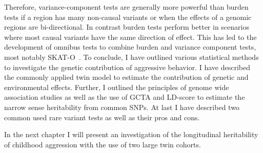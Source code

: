 Therefore, variance-component tests are generally more powerful than burden tests if a region has many non-causal variants or when the effects of a genomic regions are bi-directional.
In contrast burden tests perform better in scenarios where most causal variants have the same direction of effect.
This has led to the development of omnibus tests to combine burden and variance component tests, most notably SKAT-O~\cite{Lee2012}.
\vfill
To conclude, I have outlined various statistical methods to investigate the genetic contribution of aggressive behavior.
I have described the commonly applied twin model to estimate the contribution of genetic and environmental effects.
Further, I outlined the principles of genome wide association studies as well as the use of GCTA and LD-score to estimate the narrow sense heritability from common SNPs.
At last I have described two common used rare variant tests as well as their pros and cons.

In the next chapter I will present an investigation of the longitudinal heritability of childhood aggression with the use of two large twin cohorts. 

